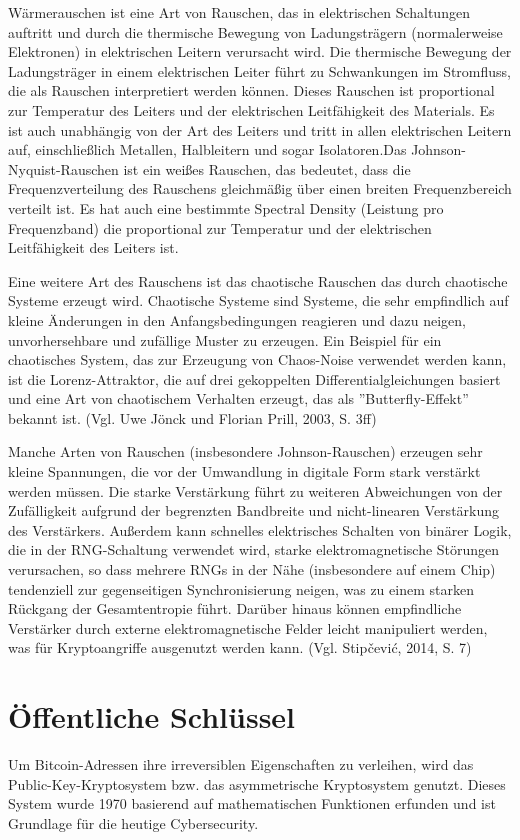 Wärmerauschen ist eine Art von Rauschen, das in elektrischen Schaltungen auftritt und durch die thermische Bewegung von Ladungsträgern
(normalerweise Elektronen) in elektrischen Leitern verursacht wird. Die thermische Bewegung der Ladungsträger in einem elektrischen Leiter führt 
zu Schwankungen im Stromfluss, die als Rauschen interpretiert werden können. Dieses Rauschen ist proportional zur Temperatur des Leiters und der 
elektrischen Leitfähigkeit des Materials. Es ist auch unabhängig von der Art des Leiters und tritt in allen elektrischen Leitern auf, 
einschließlich Metallen, Halbleitern und sogar Isolatoren.Das Johnson-Nyquist-Rauschen ist ein weißes Rauschen, das bedeutet, dass die 
Frequenzverteilung des Rauschens gleichmäßig über einen breiten Frequenzbereich verteilt ist. Es hat auch eine bestimmte Spectral Density 
(Leistung pro Frequenzband) die proportional zur Temperatur und der elektrischen Leitfähigkeit des Leiters ist.

Eine weitere Art des Rauschens ist das chaotische Rauschen das durch chaotische Systeme erzeugt wird. Chaotische Systeme sind Systeme, die sehr 
empfindlich auf kleine Änderungen in den Anfangsbedingungen reagieren und dazu neigen, unvorhersehbare und zufällige Muster zu erzeugen. Ein Beispiel 
für ein chaotisches System, das zur Erzeugung von Chaos-Noise verwendet werden kann, ist die Lorenz-Attraktor, die auf drei gekoppelten 
Differentialgleichungen basiert und eine Art von chaotischem Verhalten erzeugt, das als ''Butterfly-Effekt'' bekannt ist. (Vgl. Uwe Jönck und Florian Prill, 2003, S. 3ff)

Manche Arten von Rauschen (insbesondere Johnson-Rauschen) erzeugen sehr kleine Spannungen, die vor der Umwandlung in digitale Form stark verstärkt
werden müssen. Die starke Verstärkung führt zu weiteren Abweichungen von der Zufälligkeit aufgrund der begrenzten Bandbreite und nicht-linearen 
Verstärkung des Verstärkers. Außerdem kann schnelles elektrisches Schalten von binärer Logik, die in der RNG-Schaltung verwendet wird, starke 
elektromagnetische Störungen verursachen, so dass mehrere RNGs in der Nähe (insbesondere auf einem Chip) tendenziell zur gegenseitigen 
Synchronisierung neigen, was zu einem starken Rückgang der Gesamtentropie führt. Darüber hinaus können empfindliche Verstärker durch externe 
elektromagnetische Felder leicht manipuliert werden, was für Kryptoangriffe ausgenutzt werden kann. (Vgl. Stipčević, 2014, S. 7)


\section{Öffentliche Schlüssel}
Um Bitcoin-Adressen ihre irreversiblen Eigenschaften zu verleihen, wird das Public-Key-Kryptosystem bzw. das asymmetrische
Kryptosystem genutzt. Dieses System wurde 1970 basierend auf mathematischen Funktionen erfunden und ist Grundlage für die heutige
Cybersecurity.

